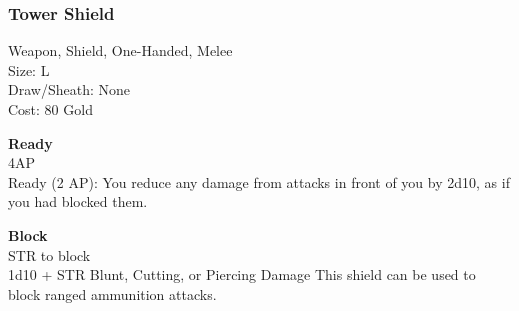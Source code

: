 \subsubsection{Tower Shield}\label{weapon:towerShield}
Weapon, Shield, One-Handed, Melee\\
Size: L\\
Draw/Sheath: None\\
Cost: 80 Gold

\textbf{Ready}\\
4AP\\
Ready (2 AP): You reduce any damage from attacks in front of you by 2d10, as if you had blocked them.

\textbf{Block}\\
STR to block\\
1d10 + \texttimes STR Blunt, Cutting, or Piercing Damage
This shield can be used to block ranged ammunition attacks.\\